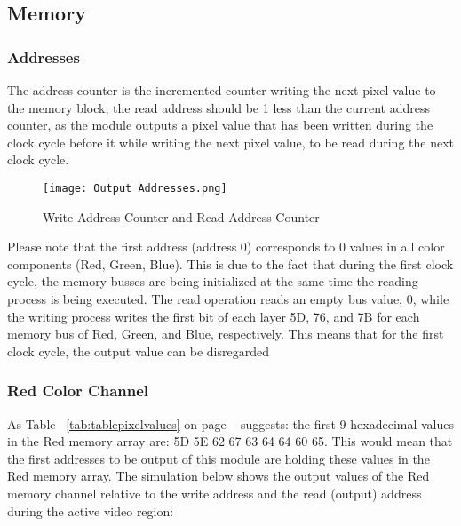 \subsection{Memory}
\subsubsection{Addresses}
\par The address counter is the incremented counter writing the next pixel value to the memory block, the read address should be 1 less than the current address counter, as the module outputs a pixel value that has been written during the clock cycle before it while writing the next pixel value, to be read during the next clock cycle. \newline

\begin{figure}[H]
    \centering
    \texttt{[image: Output Addresses.png]}
    \caption{ Write Address Counter and Read Address Counter }
    \label{fig:addressesOutput}  
\end{figure}

\par Please note that the first address (address 0) corresponds to 0 values in all color components (Red, Green, Blue). This is due to the fact that during the first clock cycle, the memory busses are being initialized at the same time the reading process is being executed. The read operation reads an empty bus value, 0, while the writing process writes the first bit of each layer 5D, 76, and 7B for each memory bus of Red, Green, and Blue, respectively. This means that for the first clock cycle, the output value can be disregarded \newline

\subsubsection{Red Color Channel}
\par As Table ~\ref{tab:tablepixelvalues} on page ~\pageref{tab:tablepixelvalues} suggests: the first 9 hexadecimal values in the Red memory array are: 5D 5E 62 67 63 64 64 60 65. This would mean that the first addresses to be output of this module are holding these values in the Red memory array. The simulation below shows the output values of the Red memory channel relative to the write address and the read (output) address during the active video region:
 \newline

